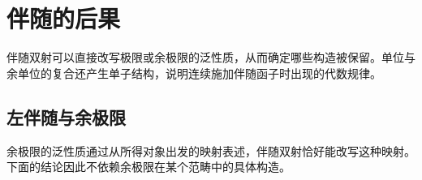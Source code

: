 
\section{伴随的后果}
\label{b4:sec:0304}

伴随双射可以直接改写极限或余极限的泛性质，从而确定哪些构造被保留。单位与余单位的复合还产生单子结构，说明连续施加伴随函子时出现的代数规律。


%
%

\subsection{左伴随与余极限}
\label{b4:subsec:0304:01}

余极限的泛性质通过从所得对象出发的映射表述，伴随双射恰好能改写这种映射。下面的结论因此不依赖余极限在某个范畴中的具体构造。

